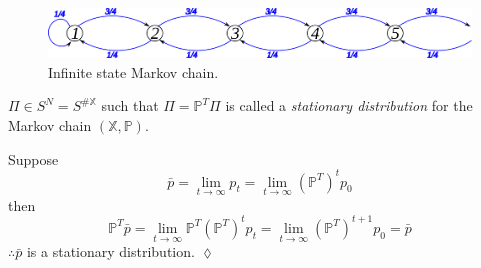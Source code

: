 \begin{figure}[ht!]
\centering
\includegraphics[width=.4\textwidth]{images/09mcinf}
\caption{Infinite state Markov chain.}
\label{fig:09mcinf}
\end{figure}

\begin{definition}
$\Pi\in S^N = S^{\#\mathbb{X}}$ such that $\Pi=\mathbb{P}^T\Pi$ is called a \textit{stationary distribution} for the Markov chain $(\mathbb{X},\mathbb{P})$.
\end{definition}

\begin{example}
Suppose
$$\bar{p}=\lim_{t\to\infty}p_t = \lim_{t\to\infty}{(\mathbb{P}^T)}^t p_0$$
then
  $$\mathbb{P}^T\bar{p}=\lim_{t\to\infty}\mathbb{P}^T{(\mathbb{P}^T)}^t p_t = \lim_{t\to\infty}{(\mathbb{P}^T)}^{t+1}p_0=\bar{p}$$
$\therefore \bar{p}$ is a stationary distribution.
$\lozenge$
\end{example}
